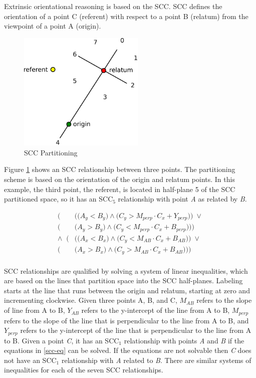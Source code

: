 \documentclass[12pt]{ucthesis}
\begin{document}
Extrinsic orientational reasoning is based on the SCC. SCC defines the orientation of a point C (referent) with respect to a point B (relatum) from the viewpoint of a point A (origin).

\begin{figure}[H]
\centering
\includegraphics[width=60mm]{scc}
\caption{SCC Partitioning}
\label{scc}
\end{figure}

Figure \ref{scc} shows an SCC relationship between three points. The partitioning scheme is based on the orientation of the origin and relatum points. In this example, the third point, the referent, is located in half-plane 5 of the SCC partitioned space, so it has an SCC$_{5}$ relationship with point \emph{A} as related by \emph{B}. 

\begin{equation}\label{scc-eq} 
\begin{aligned}
\Big(&\Big(\Big(A_{y} < B_{y}\Big) \wedge \Big(C_{y} > M_{perp} \cdot C_{x} + Y_{perp}\Big)\Big) \; \lor \\
\Big(&\Big(A_{y} > B_{y}\Big) \wedge \Big(C_{y} < M_{perp} \cdot C_{x} + B_{perp}\Big)\Big)\Big) \\
\wedge \;\; \Big(&\Big(\Big(A_{x} < B_{x}\Big) \wedge \Big(C_{y} < M_{AB} \cdot C_{x} + B_{AB}\Big)\Big) \; \lor \\
\Big(&\Big(A_{x} > B_{x}\Big) \wedge \Big(C_{y} > M_{AB} \cdot C_{x} + B_{AB}\Big)\Big)\Big) \\
\end{aligned}
\end{equation}

SCC relationships are qualified by solving a system of linear inequalities, which are based on the lines that partition space into the SCC half-planes. Labeling starts at the line that runs between the origin and relatum, starting at zero and incrementing clockwise. Given three points A, B, and C, $M_{AB}$ refers to the slope of line from A to B, $Y_{AB}$ refers to the y-intercept of the line from A to B, $M_{perp}$ refers to the slope of the line that is perpendicular to the line from A to B, and $Y_{perp}$ refers to the y-intercept of the line that is perpendicular to the line from A to B. Given a point \emph{C}, it has an SCC$_{1}$ relationship with points \emph{A} and \emph{B} if the equations in \ref{scc-eq} can be solved. If the equations are not solvable then \emph{C} does not have an SCC$_{1}$ relationship with \emph{A} related to \emph{B}. There are similar systems of inequalities for each of the seven SCC relationships.  
\end{document}
